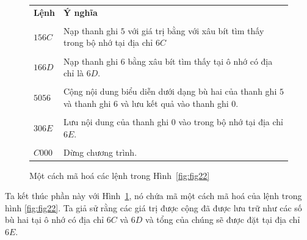 \begin{figure}[thb]
  \centering
  \begin{tabular}{m{2.5cm}m{7cm}}
    \textbf{Lệnh}   & \textbf{Ý nghĩa}                                                             \\ \\
    $156C$ & Nạp thanh ghi $5$ với giá trị bằng với xâu bít tìm thấy trong bộ nhớ tại địa chỉ $6C$                                                                           \\ \\

    $166D$ & Nạp thanh ghi $6$ bằng xâu bít tìm thấy tại ô nhớ có địa chỉ là $6D$. \\  \\

    $5056$ & Cộng nội dung biểu diễn dưới dạng bù hai của thanh ghi $5$ và thanh ghi $6$ và lưu kết quả vào thanh ghi  $0$.                                                \\ \\

    $306E$ & Lưu nội dung của thanh ghi $0$ vào trong bộ nhớ tại địa chỉ $6E$.     \\ \\

    $C000$ & Dừng chương trình. 
  \end{tabular}
  \caption{Một cách mã hoá các lệnh trong Hình~\ref{fig:fig22}}
  \label{fig:fig27}
\end{figure}


Ta kết thúc phần này với Hình~\ref{fig:fig27}, nó chứa mã một cách mã hoá của lệnh trong hình
\ref{fig:fig22}. Ta giả sử rằng các giá trị được cộng đã được lưu trữ như các số bù hai tại ô
nhớ có địa chỉ $6C$ và $6D$ và tổng của chúng sẽ được đặt tại địa chỉ $6E$.

